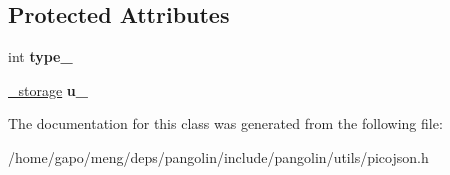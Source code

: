 \subsection*{Protected Attributes}
\begin{DoxyCompactItemize}
\item 
int {\bfseries type\+\_\+}\hypertarget{classpangolin_1_1json_1_1value_ac72be5858ea55ef2b54815b70856d56e}{}\label{classpangolin_1_1json_1_1value_ac72be5858ea55ef2b54815b70856d56e}

\item 
\hyperlink{unionpangolin_1_1json_1_1value_1_1__storage}{\+\_\+storage} {\bfseries u\+\_\+}\hypertarget{classpangolin_1_1json_1_1value_aed6388e301197199b6ff01e9aaef27ce}{}\label{classpangolin_1_1json_1_1value_aed6388e301197199b6ff01e9aaef27ce}

\end{DoxyCompactItemize}


The documentation for this class was generated from the following file\+:\begin{DoxyCompactItemize}
\item 
/home/gapo/meng/deps/pangolin/include/pangolin/utils/picojson.\+h\end{DoxyCompactItemize}
